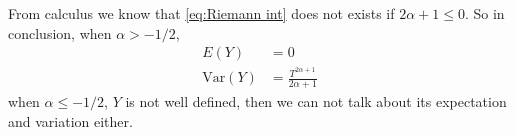 \documentclass{homework}
\newcommand{\var}{\mathrm{Var}}
\begin{document}
\begin{subproblem}[(\arabic*).]
        From calculus we know that \cref{eq:Riemann int} does
        not exists if $2\alpha+1\leq 0$.
        So in conclusion,
        when $\alpha>-1/2$,
        \[\begin{aligned}
            E(Y)&=0\\
            \var(Y)&=\frac{T^{2\alpha+1}}{2\alpha+1}
        \end{aligned}\]
        when $\alpha\leq -1/2$, $Y$ is not well defined, then
        we can not talk about its expectation and variation either.
    \end{subproblem}
\end{document}
